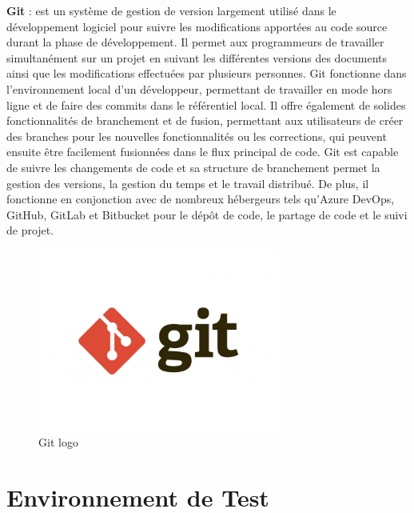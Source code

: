 \textbf{Git} : est un système de gestion de version largement utilisé dans le développement logiciel pour suivre les modifications apportées au code source durant la phase de développement. Il permet aux programmeurs de travailler simultanément sur un projet en suivant les différentes versions des documents ainsi que les modifications effectuées par plusieurs personnes. Git fonctionne dans l'environnement local d'un développeur, permettant de travailler en mode hors ligne et de faire des commits dans le référentiel local. Il offre également de solides fonctionnalités de branchement et de fusion, permettant aux utilisateurs de créer des branches pour les nouvelles fonctionnalités ou les corrections, qui peuvent ensuite être facilement fusionnées dans le flux principal de code. Git est capable de suivre les changements de code et sa structure de branchement permet la gestion des versions, la gestion du temps et le travail distribué. De plus, il fonctionne en conjonction avec de nombreux hébergeurs tels qu'Azure DevOps, GitHub, GitLab et Bitbucket pour le dépôt de code, le partage de code et le suivi de projet.
\\
\begin{figure}[H] 
    \centering
    \includegraphics[width=8cm]{Figures/gitlogo.jpg}
        \caption{Git logo}
\end{figure}



\section{Environnement de Test}


